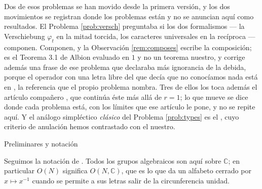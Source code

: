 \documentclass[11pt,reqno]{amsart}
\makeatletter
\renewcommand\section{\@startsection{section}{1}%
  \z@{\linespacing\@plus\linespacing}{.5\linespacing}%
  {\normalfont\large\bfseries\centering}}
\theoremstyle{plain}
\theoremstyle{definition}
\newcommand{\CC}{\mathbb{C}}
\makeatother
\begin{document}
Dos de esos problemas se han movido desde la primera versión, y los dos movimientos se registran
donde los problemas están y no se anuncian aquí como resultados. El Problema \ref{prob:versch}
preguntaba si los dos formalismos --- la Verschiebung $\varphi_t$ en la mitad torcida, los caracteres
universales en la recíproca --- componen. Componen, y la Observación \ref{rem:composes} escribe la
composición; es el Teorema 3.1 de Albion evaluado en $1$ y no un teorema nuestro, y corrige además
una frase de ese problema que declaraba más ignorancia de la debida, porque el operador con una letra
libre del que decía que no conocíamos nada está en \cite[\S6.1]{Alb23}, la referencia que el propio
problema nombra. Tres de ellos los toca además el artículo compañero \cite{PaperII}, que continúa éste
más allá de $r=1$; lo que mueve se dice donde cada problema está, con los límites que ese
artículo le pone, y no se repite aquí. Y el análogo simpléctico \emph{clásico} del Problema \ref{prob:types} es el
\cite[Teorema 2.8]{Kum24}, cuyo criterio de anulación hemos contrastado con el nuestro.

\section{Preliminares y notación}\label{sec:background}

Seguimos la notación de \cite{AK22,AK25}. Todos los grupos algebraicos son aquí sobre $\CC$; en
particular $O(N)$ significa $O(N,\CC)$, que es lo que da un alfabeto cerrado por $x\mapsto x^{-1}$
cuando se permite a sus letras salir de la circunferencia unidad.
\end{document}
